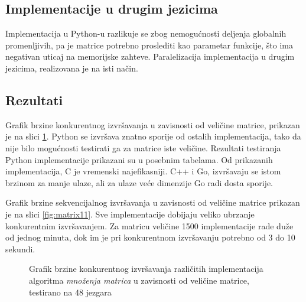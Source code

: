 \documentclass[12pt,oneside]{memoir}
\begin{document}
\subsection{Implementacije u drugim jezicima}
Implementacija u Python-u razlikuje se zbog nemogućnosti deljenja globalnih promenljivih, pa je matrice potrebno proslediti kao parametar funkcije, što ima negativan uticaj na memorijske zahteve. Paralelizacija implementacija u drugim jezicima, realizovana je na isti način. 

\subsection{Rezultati}

Grafik brzine konkurentnog izvršavanja u zavisnosti od veličine matrice, prikazan je na slici \ref{fig:matrix1}. Python se izvršava znatno sporije od ostalih implementacija, tako da nije bilo mogućnosti testirati ga za matrice iste veličine. Rezultati testiranja Python implementacije prikazani su u posebnim tabelama. Od prikazanih implementacija, C je vremenski najefikasniji. C++ i Go, izvršavaju se istom brzinom za manje ulaze, ali za ulaze veće dimenzije Go radi dosta sporije. 

Grafik brzine sekvencijalnog izvršavanja u zavisnosti od veličine matrice prikazan je na slici \ref{fig:matrix11}. Sve implementacije dobijaju veliko ubrzanje konkurentnim izvršavanjem. Za matricu veličine 1500 implementacije rade duže od jednog minuta, dok im je pri konkurentnom izvršavanju potrebno od 3 do 10 sekundi.

\begin{figure}
\begin{center}


\caption{Grafik brzine konkurentnog izvršavanja različitih implementacija algoritma \textit{množenja matrica} u zavisnosti od veličine matrice, testirano na 48 jezgara}
\label{fig:matrix1}
\end{center}
\end{figure}
\end{document}
